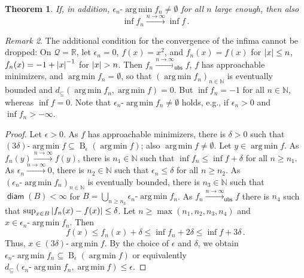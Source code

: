 \documentclass{scrartcl}
\renewcommand{\subset}{\subseteq}
\DeclareMathOperator{\diam}{\mathsf{diam}}
\DeclareMathOperator{\ball}{\mathrm{B}}
\newcommand{\N}{\mathbb{N}}
\newcommand{\R}{\mathbb{R}}
\newcommand{\equationFullstop}{\, .}
\newcommand{\eqfs}{\equationFullstop}
\DeclareMathOperator*{\argmin}{arg\,min}
\def\MS{\mathcal{Q}}\def\epi{\mathsf{epi}}\def\aec{\mathsf{aec}}\def\alsec{\mathsf{alsec}}\def\aecp{\mathsf{aec}_P}\def\Hausdorff{\mathsf{H}}\def\Haus{\mathsf{H}}\def\ubs{\mathsf{ubs}}\newcommand{\epiconv}[1]{\xrightarrow{#1\to\infty}_\epi}\newcommand{\hausconv}[1]{\xrightarrow{#1\to\infty}_\Hausdorff}\newcommand{\ubsconv}[1]{\xrightarrow{#1\to\infty}_\ubs}\newcommand{\ol}[2]{\overline{#1,\!#2}}
\theoremstyle{plain}\newtheorem{theorem}{Theorem}[section]
\theoremstyle{definition}
\theoremstyle{remark}
\newtheorem{remark}[theorem]{Remark}
\begin{document}
\begin{appendix}
\begin{theorem}
	If, in addition, $\epsilon_n\text{-}\argmin f_n \neq \emptyset$ for all $n$ large enough, then also
	\begin{equation*}
		\inf f_n \xrightarrow{n\to\infty} \inf f
		\eqfs
	\end{equation*}
\end{theorem}
\begin{remark}\label{rem:alt:nonempty}
	The additional condition for the convergence of the infima cannot be dropped: On $\MS=\R$, let $\epsilon_n = 0$, $f(x) = x^2$, and $f_n(x) = f(x)$ for $\left| x \right| \leq n$, $f_n(x) = -1 + \left| x \right|^{-1}$ for $\left| x \right| > n$. Then $f_n\ubsconv{n}f$, $f$ has approachable minimizers, and $\argmin f_n = \emptyset$, so that $(\argmin f_n)_{n\in\N}$ is eventually bounded and $d_\subset(\argmin f_n, \argmin f) = 0$. But $\inf f_n = -1$ for all $n\in\N$, whereas $\inf f = 0$.
	Note that $\epsilon_n\text{-}\argmin f_n \neq\emptyset$ holds, e.g., if $\epsilon_n > 0$ and $\inf f_n > -\infty$.
\end{remark}
\begin{proof}
		Let $\epsilon >0$. As $f$ has approachable minimizers, there is $\delta > 0$ such that $(3\delta)\text{-}\argmin f \subset \ball_\epsilon(\argmin f)$; also $\argmin f \neq \emptyset$. Let $y\in\argmin f$. As $f_n(y) \xrightarrow{n\to\infty} f(y)$, there is $n_1\in\N$ such that $\inf f_n \leq \inf f + \delta$ for all $n \geq n_1$.		
		As $\epsilon_n \xrightarrow{n\to\infty} 0$, there is $n_2\in\N$ such that $\epsilon_n \leq \delta$ for all $n \geq n_2$.
		As $(\epsilon_n\text{-}\argmin f_n)_{n\in\N}$ is eventually bounded, there is $n_3\in\N$ such that $\diam(B) < \infty$ for $B = \bigcup_{n\geq n_3} \epsilon_n\text{-}\argmin f_n$.
		As $f_n \xrightarrow{n\to\infty}_{\ubs} f$ there is $n_4$ such that $\sup_{x\in B}\left| f_n(x) - f(x) \right| \leq \delta$.
		Let $n \geq \max(n_1, n_2, n_3, n_4)$ and $x \in \epsilon_n\text{-}\argmin f_n$. Then
		\begin{equation*}
			f(x) \leq f_n(x) + \delta \leq \inf f_n + 2\delta \leq \inf f + 3\delta\eqfs
		\end{equation*}
		Thus, $x \in (3\delta)\text{-}\argmin f$. By the choice of $\epsilon$ and $\delta$, we obtain $\epsilon_n\text{-}\argmin f_n \subset \ball_\epsilon(\argmin f)$ or equivalently $d_{\subset}(\epsilon_n\text{-}\argmin f_n, \argmin f) \leq \epsilon$.
		

\end{proof}
\end{appendix}
\end{document}
